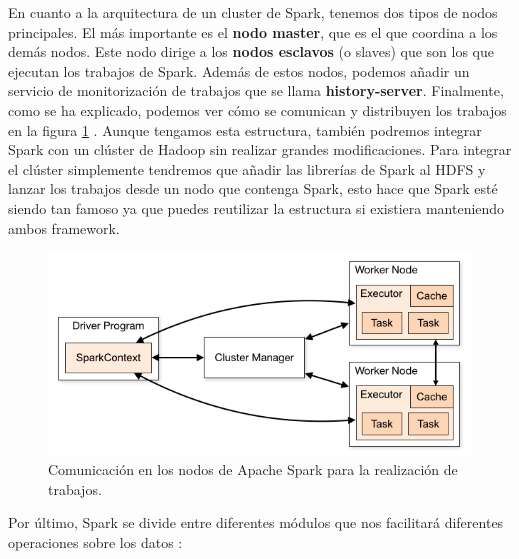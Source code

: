 En cuanto a la arquitectura de un cluster de Spark, tenemos dos tipos de
nodos principales. El más importante es el \textbf{nodo master}, que es el
que coordina a los demás nodos. Este nodo dirige a los \textbf{nodos
  esclavos} (o slaves) que son los que ejecutan los trabajos de Spark.
Además de estos nodos, podemos añadir un servicio de monitorización de
trabajos que se llama \textbf{history-server}. Finalmente, como se ha
explicado, podemos ver cómo se comunican y distribuyen los trabajos en la
figura \ref{SpkImg-1} \cite{Spk-6}. Aunque tengamos esta estructura,
también podremos integrar Spark con un clúster de Hadoop sin realizar
grandes modificaciones. Para integrar el clúster simplemente tendremos que
añadir las librerías de Spark al HDFS y lanzar los trabajos desde un nodo
que contenga Spark, esto hace que Spark esté siendo tan famoso ya que
puedes reutilizar la estructura si existiera manteniendo ambos framework.

\begin{figure}[htp]
\centering
\includegraphics[scale=0.65]{Imagenes/spark1.png}
\caption{Comunicación en los nodos de Apache Spark para la realización de
  trabajos.}
\label{SpkImg-1}
\end{figure}

Por último, Spark se divide entre diferentes módulos que nos facilitará
diferentes operaciones sobre los datos \cite{Spk-3}:

